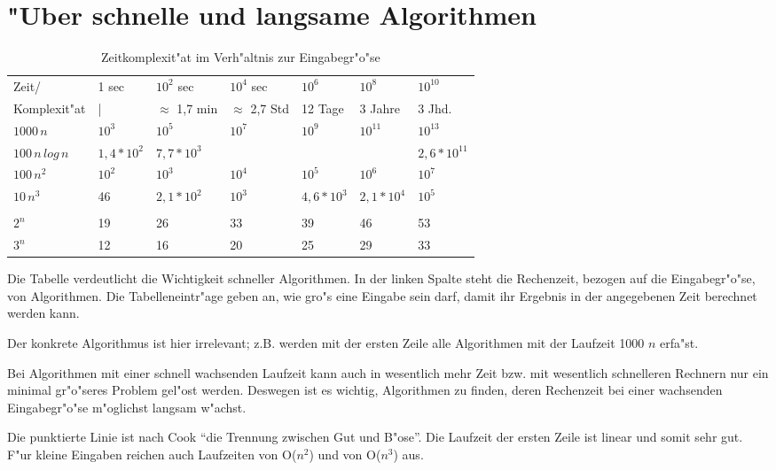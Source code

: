 \documentclass[draft,12pt]{scrreprt}
\theoremstyle{break}
\begin{document}
\section{"Uber schnelle und langsame Algorithmen}
\begin{table}[h]
  \begin{tabular}{*{7}{|l}|}
    \hline
    Zeit/ & 1 sec & $10^2$ sec & $10^4$ sec & $10^6$ & $10^8$ & $10^{10}$ \\
    Komplexit"at & | & $\approx$ 1,7 min & $\approx$ 2,7 Std & 12 Tage & 3 Jahre & 3 Jhd.\\
    \hline
    $1000 \, n$ & $10^3$ & $10^5$ & $10^7$ & $10^9$ & $10^{11}$ & $10^{13}$ \\
    $100 \, n \, log \, n$ & $1,4*10^2$ & $7,7*10^3$ & & & & $2,6*10^{11}$ \\
    $100 \, n^2$ & $10^2$ & $10^3$ & $10^4$ & $10^5$ & $10^6$ & $10^7$\\
    $10 \, n^3$ & 46 & $2,1*10^2$ & $10^3$ & $4,6*10^3$ & $2,1*10^4$ & $10^5$ \\
    \\
    $2^n$ & 19 & 26 & 33 & 39 & 46 & 53\\
    $3^n$ & 12 & 16 & 20 & 25 & 29 & 33\\
    \hline
  \end{tabular}
  \caption{Zeitkomplexit"at im Verh"altnis zur Eingabegr"o"se}
\end{table}

Die Tabelle verdeutlicht die Wichtigkeit schneller Algorithmen. 
In der linken Spalte steht die Rechenzeit, bezogen auf die Eingabegr"o"se, von Algorithmen. 
Die Tabelleneintr"age geben an, wie gro"s eine Eingabe sein darf, damit ihr Ergebnis in der angegebenen Zeit berechnet werden kann. 

Der konkrete Algorithmus ist hier irrelevant; z.B. werden mit der ersten Zeile alle Algorithmen mit der Laufzeit 1000 $n$ erfa"st. 

Bei Algorithmen mit einer schnell wachsenden Laufzeit kann auch in wesentlich mehr Zeit bzw. mit wesentlich schnelleren Rechnern nur ein
minimal gr"o"seres Problem gel"ost werden. Deswegen ist es wichtig, Algorithmen zu finden, deren Rechenzeit bei einer wachsenden
Eingabegr"o"se m"oglichst langsam w"achst.

Die punktierte Linie ist nach Cook "`die Trennung zwischen Gut und
B"ose"'. Die Laufzeit der ersten Zeile ist linear und somit sehr gut.
F"ur kleine Eingaben reichen auch Laufzeiten von O($n^2$) und von O($n^3$) aus.
\end{document}
